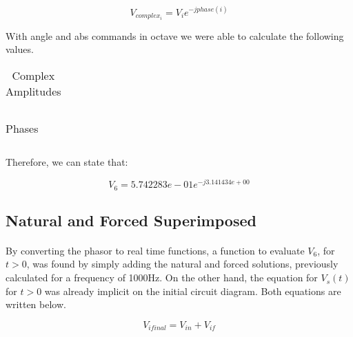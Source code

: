\begin{equation}
	V_{complex_i} = V_i e^{-j phase(i)}
\end{equation}

\par With angle and abs commands in octave we were able to calculate the following values.

\begin{table}[H]
    \centering
    \begin{tabular}{|c|c|}
    \hline
        
    \end{tabular}
    \caption{Complex Amplitudes}
    \label{table4a}
\end{table}

\paragraph{}

\begin{table}[H]
    \centering
    \begin{tabular}{|c|c|}
    \hline
        
    \end{tabular}
    \caption{Phases}
    \label{table4b}
\end{table}


Therefore, we can state that:

\begin{equation}
	V_6 = 5.742283e-01 e^{-j 3.141434e+00}
\end{equation}

\subsection{Natural and Forced Superimposed}
\paragraph{}

\par By converting the phasor to real time functions, a function to evaluate $V_6$, for $t>0$, was found by simply adding the natural and forced solutions, previously calculated for a frequency of 1000Hz. On the other hand, the equation for $V_s(t)$ for $t>0$ was already implicit on the initial circuit diagram. Both equations are written below.

\begin{equation}
	V_{ifinal} = V_{in} + V_{if}
\end{equation}

